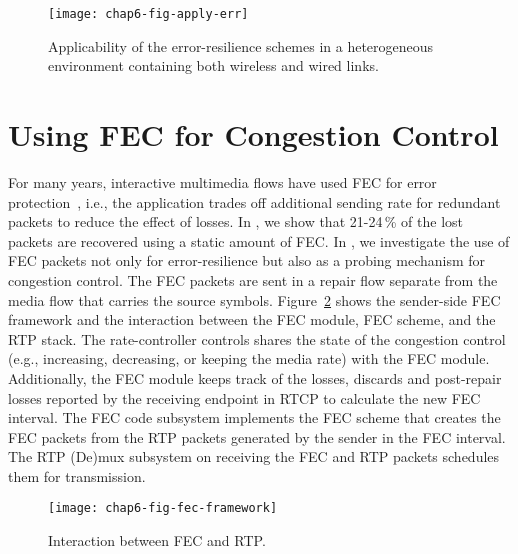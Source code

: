 \begin{figure}[!t]
\centerline {
\texttt{[image: chap6-fig-apply-err]}
}
\caption{Applicability of the error-resilience schemes in a heterogeneous
environment containing both wireless and wired links.}
\label{fig:apply_err}
\end{figure}


\section{Using FEC for Congestion Control}

For many years, interactive multimedia flows have used FEC for error
protection~\cite{wang00review, wang98error}, i.e., the
application trades off additional sending rate for redundant packets to reduce
the effect of losses. In , we show that 21-24\,\% of the lost
packets are recovered using a static amount of FEC. In , we
investigate the use of FEC packets not only for error-resilience but also as a
probing mechanism for congestion control. The FEC packets are sent in
a repair flow separate from the media flow that carries the source symbols.
Figure~\ref{fig:fec_fw} shows the sender-side FEC framework and the interaction
between the FEC module, FEC scheme, and the RTP stack. The rate-controller
controls shares the state of the congestion control (e.g., increasing, decreasing,
or keeping the media rate) with the FEC module. Additionally, the FEC module
keeps track of the losses, discards and post-repair losses reported by the
receiving endpoint in RTCP to calculate the new FEC interval. The FEC code
subsystem implements the FEC scheme that creates the FEC packets from the
RTP packets generated by the sender in the FEC interval. The RTP (De)mux
subsystem on receiving the FEC and RTP packets schedules them for transmission.

\begin{figure}[!t]
\centerline {
\texttt{[image: chap6-fig-fec-framework]}
}
\caption{Interaction between FEC and RTP.}
\label{fig:fec_fw}
\end{figure}

